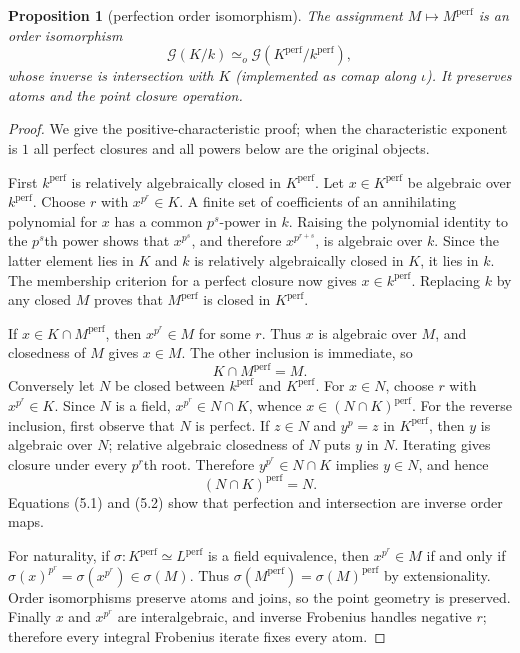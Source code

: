 \documentclass[11pt,oneside]{article}
\newtheorem{proposition}[theorem]{Proposition}
\theoremstyle{definition}
\theoremstyle{remark}
\newcommand{\G}{\mathcal{G}}
\begin{document}
\begin{proposition}[perfection order isomorphism]\label{prop:perf-lattice}
The assignment $M\mapsto M^{\mathrm{perf}}$ is an order isomorphism
\[
  \G(K/k)\simeq_o\G(K^{\mathrm{perf}}/k^{\mathrm{perf}}),
\]
whose inverse is intersection with $K$ (implemented as comap along $\iota$).
It preserves atoms and the point closure operation.
\end{proposition}
\begin{proof}
We give the positive-characteristic proof; when the characteristic exponent is $1$ all
perfect closures and all powers below are the original objects.

First $k^{\mathrm{perf}}$ is relatively algebraically closed in
$K^{\mathrm{perf}}$.  Let $x\in K^{\mathrm{perf}}$ be algebraic over
$k^{\mathrm{perf}}$.  Choose $r$ with $x^{p^r}\in K$.  A finite set of coefficients
of an annihilating polynomial for $x$ has a common $p^s$-power in $k$.  Raising the
polynomial identity to the $p^s$th power shows that $x^{p^s}$, and therefore
$x^{p^{r+s}}$, is algebraic over $k$.  Since the latter element lies in $K$ and $k$ is
relatively algebraically closed in $K$, it lies in $k$.  The membership criterion for a
perfect closure now gives $x\in k^{\mathrm{perf}}$.  Replacing $k$ by any closed $M$
proves that $M^{\mathrm{perf}}$ is closed in $K^{\mathrm{perf}}$.

If $x\in K\cap M^{\mathrm{perf}}$, then $x^{p^r}\in M$ for some $r$.  Thus $x$ is
algebraic over $M$, and closedness of $M$ gives $x\in M$.  The other inclusion is
immediate, so
\[
 K\cap M^{\mathrm{perf}}=M.                                      \tag{5.1}
\]
Conversely let $N$ be closed between $k^{\mathrm{perf}}$ and
$K^{\mathrm{perf}}$.  For $x\in N$, choose $r$ with $x^{p^r}\in K$.  Since $N$ is a
field, $x^{p^r}\in N\cap K$, whence $x\in(N\cap K)^{\mathrm{perf}}$.  For the reverse
inclusion, first observe that $N$ is perfect.  If $z\in N$ and $y^p=z$ in
$K^{\mathrm{perf}}$, then $y$ is algebraic over $N$; relative algebraic closedness of
$N$ puts $y$ in $N$.  Iterating gives closure under every $p^r$th root.  Therefore
$y^{p^r}\in N\cap K$ implies $y\in N$, and hence
\[
 (N\cap K)^{\mathrm{perf}}=N.                                   \tag{5.2}
\]
Equations (5.1) and (5.2) show that perfection and intersection are inverse order maps.

For naturality, if $\sigma:K^{\mathrm{perf}}\simeq L^{\mathrm{perf}}$ is a field
equivalence, then
$x^{p^r}\in M$ if and only if $\sigma(x)^{p^r}=\sigma(x^{p^r})\in\sigma(M)$.
Thus $\sigma(M^{\mathrm{perf}})=\sigma(M)^{\mathrm{perf}}$ by extensionality.
Order isomorphisms preserve atoms and joins, so the point geometry is preserved.
Finally $x$ and $x^{p^r}$ are interalgebraic, and inverse Frobenius handles negative
$r$; therefore every integral Frobenius iterate fixes every atom.
\end{proof}
\end{document}
